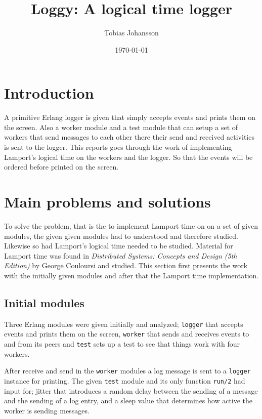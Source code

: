 \documentclass[a4paper, 11pt]{article}
\title{Loggy: A logical time logger}
\author{Tobias Johansson}
\date{\today{}}
\begin{document}
\maketitle

\section{Introduction}

A primitive Erlang logger is given that simply accepts events and prints them on the screen. Also a worker module and a test module that can setup a set of workers that send messages to each other there their send and received activities is sent to the logger. This reports goes through the work of implementing Lamport's logical time on the workers and the logger. So that the events will be ordered before printed on the screen.

\section{Main problems and solutions}

To solve the problem, that is the to implement Lamport time on on a set of given modules, the given given modules had to understood and therefore studied. Likewise so had Lamport's logical time needed to be studied. Material for Lamport time was found in \textit{Distributed Systems: Concepts and Design (5th Edition)} by George Couloursi and studied. This section first presents the work with the initially given modules and after that the Lamport time implementation.

\subsection{Initial modules}

Three Erlang modules were given initially and analyzed; \verb!logger! that accepts events and prints them on the screen, \verb!worker! that sends and receives events to and from its peers and \verb!test! sets up a test to see that things work with four workers.

After receive and send in the \verb!worker! modules a log message is sent to a \verb!logger! instance for printing. The given \verb!test! module and its only function \verb!run/2! had input for; jitter that introduces a random delay between the sending of a message and the sending of a log entry, and a sleep value that determines how active the worker is sending messages.
\end{document}
